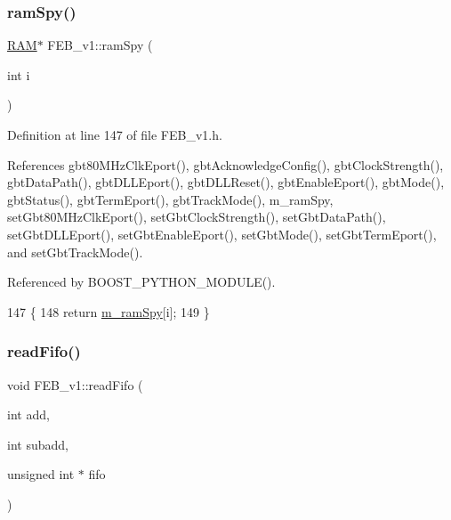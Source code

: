 \subsubsection{\texorpdfstring{ram\+Spy()}{ramSpy()}}
{\footnotesize\ttfamily \hyperlink{classRAM}{R\+AM}$\ast$ F\+E\+B\+\_\+v1\+::ram\+Spy (\begin{DoxyParamCaption}\item[{int}]{i }\end{DoxyParamCaption})\hspace{0.3cm}{\ttfamily [inline]}}



Definition at line 147 of file F\+E\+B\+\_\+v1.\+h.



References gbt80\+M\+Hz\+Clk\+Eport(), gbt\+Acknowledge\+Config(), gbt\+Clock\+Strength(), gbt\+Data\+Path(), gbt\+D\+L\+L\+Eport(), gbt\+D\+L\+L\+Reset(), gbt\+Enable\+Eport(), gbt\+Mode(), gbt\+Status(), gbt\+Term\+Eport(), gbt\+Track\+Mode(), m\+\_\+ram\+Spy, set\+Gbt80\+M\+Hz\+Clk\+Eport(), set\+Gbt\+Clock\+Strength(), set\+Gbt\+Data\+Path(), set\+Gbt\+D\+L\+L\+Eport(), set\+Gbt\+Enable\+Eport(), set\+Gbt\+Mode(), set\+Gbt\+Term\+Eport(), and set\+Gbt\+Track\+Mode().



Referenced by B\+O\+O\+S\+T\+\_\+\+P\+Y\+T\+H\+O\+N\+\_\+\+M\+O\+D\+U\+L\+E().


\begin{DoxyCode}
147                      \{
148     \textcolor{keywordflow}{return} \hyperlink{classFEB__v1_ae6d8176c12bd60ad25ed81d535eb8c82}{m\_ramSpy}[i];
149   \}
\end{DoxyCode}
\mbox{\label{classFEB__v1_af945f99a912c5ad076ebdb03dbb6c139}} 
\subsubsection{\texorpdfstring{read\+Fifo()}{readFifo()}}
{\footnotesize\ttfamily void F\+E\+B\+\_\+v1\+::read\+Fifo (\begin{DoxyParamCaption}\item[{int}]{add,  }\item[{int}]{subadd,  }\item[{unsigned int $\ast$}]{fifo }\end{DoxyParamCaption})}



